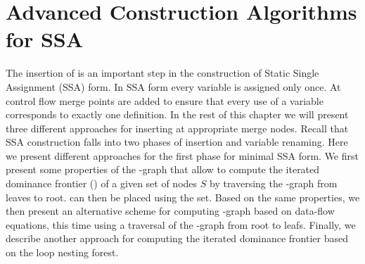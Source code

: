 \chapter{Advanced Construction Algorithms for SSA
   }
\label{chapter:alternative_ssa_construction_algorithms}

{

\def\p{$\phi$}
\def\st#1{\rlap{\raisebox{3.4pt}{\kern3pt{\scriptsize\it #1}}}{\rightarrow}}
\def\stplus{\rlap{\raisebox{3.4pt}{\kern3pt{\scriptsize+}}}{\rightarrow}}
\def\St#1{\rlap{\raisebox{3.4pt}{\kern3pt{\scriptsize\it #1}}}{\Rightarrow}}
\def\depth{\textrm{depth}}
\newcommand\subtree[1]{\textsf{subtree}(#1)}

\def\p{$\phi$}
\def\iDFfwd{\iDF\!\!_{\textit{fwd}}}



The insertion of \phifuns{} is an important step in the construction of Static Single Assignment (SSA) form. 
In SSA form every variable is assigned only once. 
At control flow merge points \phifuns are added to ensure that every use of a variable corresponds to exactly one definition. 
In the rest of this chapter we will present three different approaches for inserting \phifuns at appropriate merge nodes. 
Recall that SSA construction falls into two phases of \phifun insertion and variable renaming. 
Here we present different approaches for the first phase for minimal SSA form. 
We first present some properties of the \DJ-graph that allow to compute the iterated dominance frontier (\iDF) of a given set of nodes $S$ by traversing the \DJ-graph from leaves to root. 
\phifuns can then be placed using the \iDF set. 
Based on the same properties, we then present an alternative scheme for computing \iDF-graph based on data-flow equations, this time using a traversal of the \DJ-graph from root to leafs. 
Finally, we describe another approach for computing the iterated dominance frontier based on the loop nesting forest.

}
